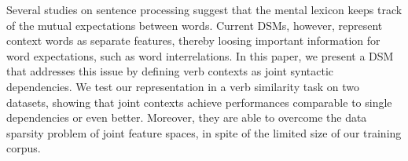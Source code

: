 Several studies on sentence processing suggest that the mental lexicon keeps track of the mutual expectations between words. Current DSMs, however, represent context words as separate features, thereby loosing important information for word expectations, such as word interrelations. In this paper, we present a DSM that addresses this issue by defining verb contexts as joint syntactic dependencies. We test our representation in a verb similarity task on two datasets, showing that joint contexts achieve performances comparable to single dependencies or even better. Moreover, they are able to overcome the data sparsity problem of joint feature spaces, in spite of the limited size of our training corpus.
